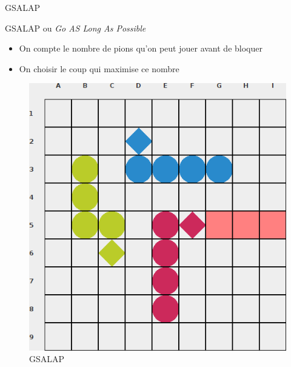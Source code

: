     \begin{frame}{GSALAP}
        \begin{block}{GSALAP ou \textit{Go AS Long As Possible}}
            \begin{itemize}
                \item On compte le nombre de pions qu'on peut jouer avant de bloquer
                \item On choisir le coup qui maximise ce nombre
            \end{itemize}
        \end{block}
        \begin{figure}
            \begin{center}
                \includegraphics[scale=0.25]{Images/GSLASP.png}
                \caption{GSALAP}
            \end{center}
        \end{figure}
    \end{frame}


